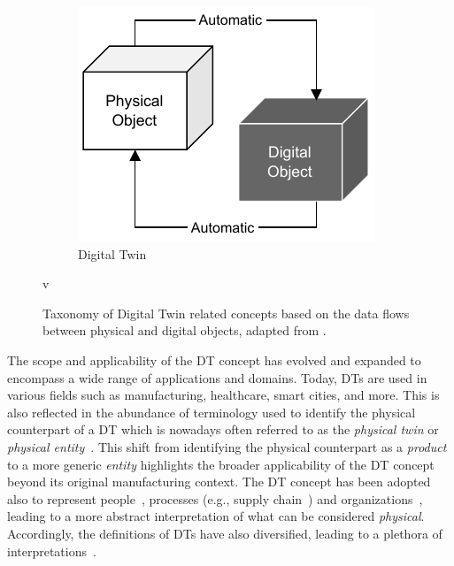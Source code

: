 \begin{figure}[ht]
\begin{subfigure}[b]{0.3\linewidth}
    \end{subfigure}
    \hfill
    \begin{subfigure}[b]{0.3\linewidth}
        \centering
        \includegraphics[width=\linewidth]{figures/kritzinger-digital-twin.pdf}
        \caption{Digital Twin}
        \label{fig:dt-taxonomy-digital-twin}
    \end{subfigure}
    \caption{Taxonomy of Digital Twin related concepts based on the data flows between physical and digital objects, adapted from \cite{kritzinger2018dtmanufacturing}.}
    \label{fig:dt-taxonomy}v
\end{figure}

The scope and applicability of the \ac{DT} concept has evolved and expanded
to encompass a wide range of applications and domains.
%
Today, \acp{DT} are used in various fields such as manufacturing, healthcare, smart cities, and more.
%
This is also reflected in the abundance of terminology used to identify the physical counterpart of a \ac{DT}
which is nowadays often referred to as the \emph{physical twin} or
\emph{physical entity}~\cite{Singh_Fuenmayor_Hinchy_Qiao_Murray_Devine_2021,JONES202036,DBLP:journals/jss/DaliborJRSWWW22}.
%
This shift from identifying the physical counterpart as a \emph{product} to a more generic \emph{entity}
highlights the broader applicability of the \ac{DT} concept beyond its original manufacturing context.
%
The \ac{DT} concept has been adopted also to represent people~\cite{Shengli_2021},
processes (e.g., supply chain~\cite{Barykin_Bochkarev_Kalinina_Yadykin_2020}) and organizations~\cite{Parmar_Leiponen_Thomas_2020}, leading to a more abstract interpretation of what can be considered \emph{physical}. 
%
Accordingly, the definitions of \acp{DT} have also diversified, leading to a plethora of interpretations~\cite{DBLP:journals/jss/DaliborJRSWWW22}. 

